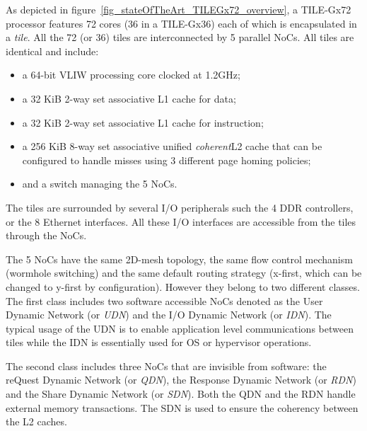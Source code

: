 \documentclass[main.tex]{subfiles}
\begin{document}
As depicted in figure~\ref{fig_stateOfTheArt_TILEGx72_overview}, a TILE-Gx72 processor features 72 cores (36 in a TILE-Gx36) each of which is encapsulated in a \emph{tile}. All the 72 (or 36) tiles are interconnected by 5 parallel NoCs.
All tiles are identical and include:
\begin{itemize}
    \item a 64-bit VLIW processing core clocked at 1.2GHz;
    \item a 32 KiB 2-way set associative L1 cache for data;
    \item a 32 KiB 2-way set associative L1 cache for instruction;
    \item a 256 KiB 8-way set associative unified \emph{coherent}\footnotemark L2 cache that can be configured to handle misses using 3 different page homing policies;
    \item and a switch managing the 5 NoCs.
\end{itemize}

The tiles are surrounded by several I/O peripherals such the 4 DDR controllers, or the 8 Ethernet interfaces. All these I/O interfaces are accessible from the tiles through the NoCs.

The 5 NoCs have the same 2D-mesh topology, the same flow control mechanism (wormhole switching) and the same default routing strategy (x-first, which can be changed to y-first by configuration). However they belong to two different classes. The first class includes two software accessible NoCs denoted as the User Dynamic Network (or \emph{UDN}) and the I/O Dynamic Network (or \emph{IDN}). The typical usage of the UDN is to enable application level communications between tiles while the IDN is essentially used for OS or hypervisor operations.

The second class includes three NoCs that are invisible from software: the reQuest Dynamic Network (or \emph{QDN}), the Response Dynamic Network (or \emph{RDN}) and the Share Dynamic Network (or \emph{SDN}). Both the QDN and the RDN handle external memory transactions. The SDN is used to ensure the coherency between the L2 caches.
\end{document}
